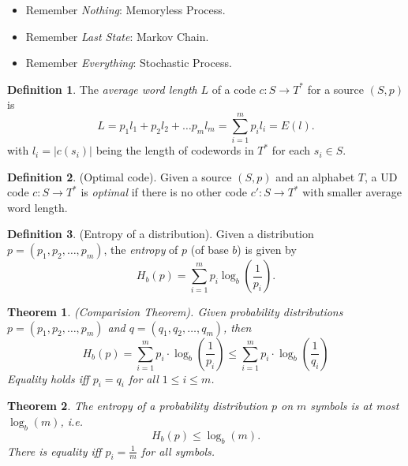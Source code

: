 \documentclass[a4paper]{article}
\newtheorem{theorem}{Theorem}
\theoremstyle{definition} \newtheorem*{definition}{Definition}
\begin{document}
\begin{remark}
  \hfill
  \begin{itemize}
    \item Remember \emph{Nothing}: Memoryless Process.
    \item Remember \emph{Last State}: Markov Chain.
    \item Remember \emph{Everything}: Stochastic Process.
  \end{itemize}
\end{remark}

\begin{definition}
  The \emph{average word length} $L$ of a code $c : S \rightarrow T^*$ for
  a source $(S,p)$ is 
  \[
    L = p_1l_1 + p_2l_2 + \dots p_ml_m = \sum_{i=1}^m p_il_i = E(l).
  \]
  with $l_i = |c(s_i)|$ being the length of codewords in $T^*$ for each
  $s_i \in S$.
\end{definition}

\begin{definition}
  (Optimal code). Given a source $(S, p)$ and an alphabet $T$, a 
  UD code $c:S \rightarrow T^*$ is \emph{optimal} if there is no other 
  code $c' : S \rightarrow T^*$ with smaller average word length.
\end{definition}

\begin{definition}
  (Entropy of a distribution). Given a distribution $p = (p_1, p_2, \dots,
  p_m)$, the \emph{entropy} of $p$ (of base $b$) is given by
  \[
    H_b(p) = \sum_{i=1}^m p_i \log_b \left( \frac{1}{p_i} \right).
  \]
\end{definition}

\begin{theorem}
  (Comparision Theorem). Given probability distributions $p = 
  \left( p_1, p_2, \dots , p_m \right)$ and $q = \left( q_1, q_2, \dots
  , q_m\right)$, then
  \[
    H_b(p) = \sum_{i=1}^m p_i \cdot \log_b\left( \frac{1}{p_i} \right)
    \leq \sum_{i=1}^m p_i \cdot\log_b\left( \frac{1}{q_i} \right)
  \]
  \label{thm:comparison}
  Equality holds iff $p_i = q_i$ for all $1 \leq i \leq m$.
\end{theorem}

\begin{theorem}
  The entropy of a probability distribution $p$ on $m$ symbols is at most
  $\log_b(m)$, i.e. 
  \[
    H_b(p) \leq \log_b(m).
  \]
  There is equality iff $p_i = \frac{1}{m}$ for all symbols.
  \label{thm:uniform}
\end{theorem}
\end{document}
